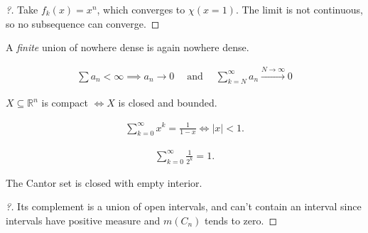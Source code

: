 \begin{proof}[?]

Take \(f_k(x) = x^n\), which converges to \(\chi(x=1)\). The limit is
not continuous, so no subsequence can converge.

\end{proof}

\begin{proposition}[?]

A \emph{finite} union of nowhere dense is again nowhere dense.

\end{proposition}

\begin{proposition}

\begin{align*}\sum a_n < \infty \implies a_n \to 0 {\quad \operatorname{and} \quad} \sum_{k=N}^\infty a_n \overset{N\to\infty}\to 0\end{align*}

\end{proposition}

\begin{theorem}

\(X\subseteq {\mathbb{R}}^n\) is compact \(\iff X\) is closed and
bounded.

\end{theorem}

\begin{proposition}

\begin{align*}
\sum_{k=0}^\infty x^k = \frac 1 {1-x} \iff {\left\lvert {x} \right\rvert} < 1
.\end{align*}

\end{proposition}

\begin{corollary}[?]

\begin{align*}
\sum_{k=0}^\infty \frac 1 {2^k} = 1
.\end{align*}

\end{corollary}

\begin{proposition}[?]

The Cantor set is closed with empty interior.

\end{proposition}

\begin{proof}[?]

Its complement is a union of open intervals, and can't contain an
interval since intervals have positive measure and \(m(C_n)\) tends to
zero.

\end{proof}

